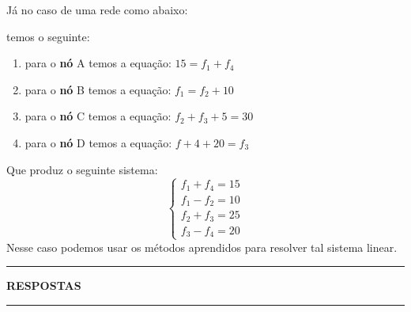 \documentclass[12pt]{exam}
\begin{document}
Já no caso de uma rede como abaixo:
\begin{figure}[!h]
\centering

\end{figure}
temos o seguinte:
\begin{enumerate}
	\item para o \textbf{nó} A temos a equação: $15 = f_1 + f_4$
	\item para o \textbf{nó} B temos a equação: $f_1 = f_2 + 10$
	\item para o \textbf{nó} C temos a equação: $f_2 + f_3 + 5 = 30$
	\item para o \textbf{nó} D temos a equação: $f+4 + 20 = f_3$
\end{enumerate}
Que produz o seguinte sistema:
\[
	\begin{cases}
		f_1 + f_4 = 15\\
		f_1 - f_2 = 10\\
		f_2 + f_3 = 25\\
		f_3 - f_4 = 20
	\end{cases}
\]
Nesse caso podemos usar os métodos aprendidos para resolver tal sistema linear.
\newpage
{}
\hrule
\begin{center}
{\large\bf RESPOSTAS}
\end{center}
\hrule

\end{document}
